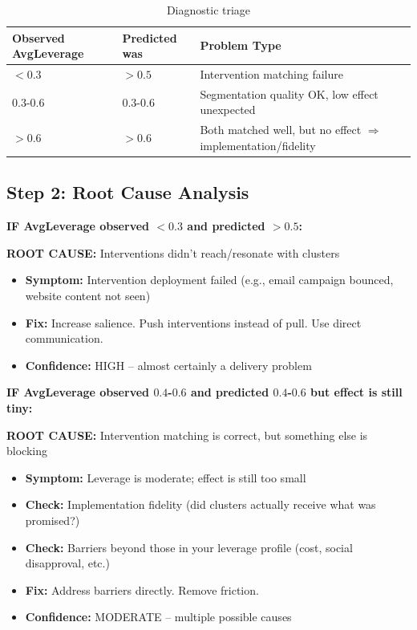 \begin{table}[h]
\centering
\small
\begin{tabular}{lll}
\toprule
\textbf{Observed AvgLeverage} & \textbf{Predicted was} & \textbf{Problem Type} \\
\midrule
$< 0.3$ & $> 0.5$ & Intervention matching failure \\
$0.3$-$0.6$ & $0.3$-$0.6$ & Segmentation quality OK, low effect unexpected \\
$> 0.6$ & $> 0.6$ & Both matched well, but no effect $\Rightarrow$ implementation/fidelity \\
\bottomrule
\end{tabular}
\caption{Diagnostic triage}
\label{tab:h4-diagnosis}
\end{table}

\subsection{Step 2: Root Cause Analysis}

\textbf{IF AvgLeverage observed $< 0.3$ and predicted $> 0.5$:}

\textbf{ROOT CAUSE:} Interventions didn't reach/resonate with clusters

\begin{itemize}[nosep]
\item \textbf{Symptom:} Intervention deployment failed (e.g., email campaign bounced, website content not seen)
\item \textbf{Fix:} Increase salience. Push interventions instead of pull. Use direct communication.
\item \textbf{Confidence:} HIGH -- almost certainly a delivery problem
\end{itemize}

\textbf{IF AvgLeverage observed $0.4$-$0.6$ and predicted $0.4$-$0.6$ but effect is still tiny:}

\textbf{ROOT CAUSE:} Intervention matching is correct, but something else is blocking

\begin{itemize}[nosep]
\item \textbf{Symptom:} Leverage is moderate; effect is still too small
\item \textbf{Check:} Implementation fidelity (did clusters actually receive what was promised?)
\item \textbf{Check:} Barriers beyond those in your leverage profile (cost, social disapproval, etc.)
\item \textbf{Fix:} Address barriers directly. Remove friction.
\item \textbf{Confidence:} MODERATE -- multiple possible causes
\end{itemize}

